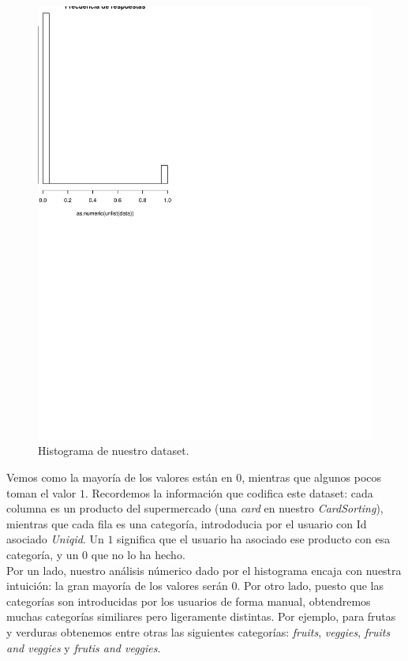 \documentclass[a4paper]{article}
\begin{document}
\begin{figure}[H]
	\includegraphics[scale=.6]{figures/hist}
	\centering
	\caption{Histograma de nuestro dataset.}
\end{figure}

Vemos como la mayoría de los valores están en $0$, mientras que algunos pocos toman el valor $1$. Recordemos la información que codifica este dataset: cada columna es un producto del supermercado (una \emph{card} en nuestro \emph{CardSorting}), mientras que cada fila es una categoría, intrododucia por el usuario con Id asociado \emph{Uniqid}. Un $1$ significa que el usuario ha asociado ese producto con esa categoría, y un $0$ que no lo ha hecho. \\

Por un lado, nuestro análisis númerico dado por el histograma encaja con nuestra intuición: la gran mayoría de los valores serán $0$. Por otro lado, puesto que las categorías son introducidas por los usuarios de forma manual, obtendremos muchas categorías similiares pero ligeramente distintas. Por ejemplo, para frutas y verduras obtenemos entre otras las siguientes categorías: \emph{fruits}, \emph{veggies}, \emph{fruits and veggies} y \emph{frutis and veggies}.
\end{document}
